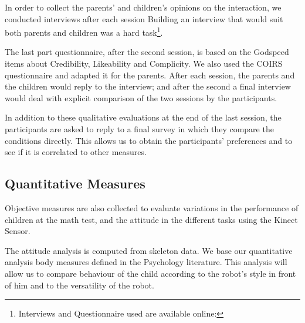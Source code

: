 \documentclass[a4paper,twocolumn]{svjour3}
\begin{document}
In order to collect the parents' and children's opinions on the interaction, we conducted interviews after each session 
Building an interview that would suit both parents and children was a hard task\footnote{Interviews and Questionnaire used are available online: }.%


The last part questionnaire, after the second session, is based on the Godspeed\cite{Bartneck2008b} items about Credibility, Likeability and Complicity. 
We also used the COIRS~\cite{Robert2014} questionnaire and adapted it for the parents.
After each session, the parents and the children would reply to the interview; and after the second a final interview would deal with explicit comparison of the two sessions by the participants.


In addition to these qualitative evaluations at the end of the last session, the participants are asked to reply to a final survey in which they compare the conditions directly. 
This allows us to obtain the participants' preferences and to see if it is correlated to other measures.

\subsection{Quantitative Measures}
Objective measures are also collected to evaluate variations in the performance of children at the math test, and the attitude in the different tasks using the Kinect Sensor.

The attitude analysis is computed from skeleton data.
We base our quantitative analysis body measures defined in the Psychology literature.
This analysis will allow us to compare behaviour of the child according to the robot's style in front of him and to the versatility of the robot.

\end{document}
